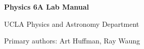 \documentclass[11pt,letterpaper]{article}
\begin{document}
\thispagestyle{plain}

\vphantom{.}
\vspace{100pt}
\begin{Huge}
\begin{center}
\textbf{Physics 6A Lab Manual}
\end{center}
\end{Huge}

\begin{Large}
\begin{center}
UCLA Physics and Astronomy Department
\end{center}
\begin{center}
Primary authors: Art Huffman, Ray Waung
\end{center}
\end{Large}

\newpage  \setcounter{equation}{0}
\newpage  \setcounter{equation}{0}
\newpage  \setcounter{equation}{0}
\newpage  \setcounter{equation}{0}
\newpage  \setcounter{equation}{0}
\newpage  \setcounter{equation}{0}
\newpage  \setcounter{equation}{0}
\newpage  \setcounter{equation}{0}
\end{document}
